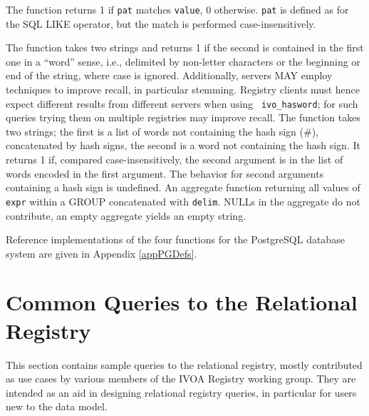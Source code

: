 \documentclass[11pt,a4paper]{ivoa}
\newcommand{\rtent}[1]{\texttt{\color{rtcolor} #1}}
\begin{document}
\begin{bigdescription}
The function returns 1 if \texttt{pat}  matches
\texttt{value}, 0 otherwise.
\texttt{pat}  is defined as for the SQL LIKE operator, but the
match is performed case-insensitively.

The function takes two strings and returns 1 if the second is
contained in the first one in a ``word'' sense, i.e., delimited by
non-letter characters or the beginning or end of the string, where case
is ignored.
Additionally, servers MAY employ techniques to improve recall, in
particular stemming.  Registry clients must hence expect different results
from different servers when using \rtent{ivo\_hasword}; for such
queries trying them on multiple registries may improve recall.
The function takes two strings; the first is a list of words not
containing the hash sign (\#), concatenated by hash signs, the second is
a word not containing the hash sign.  It returns 1 if, compared
case-insensitively, the second argument is in the list of words encoded in
the first argument.  The behavior for second
arguments containing a hash sign is undefined.
An aggregate function returning all values of
\texttt{expr} within a GROUP concatenated with 
\texttt{delim}.  NULLs in the aggregate do not contribute, an empty 
aggregate yields an empty string.

\end{bigdescription}

Reference implementations of the four functions for the PostgreSQL
database system are given in Appendix \ref{appPGDefs}.



\section{Common Queries to the Relational Registry}

\label{sample_queries}

This section contains sample queries to the relational registry,
mostly contributed as use cases by various members of the IVOA Registry
working group.  They are intended as an aid in designing relational
registry queries, in particular for users new to the data model.
\end{document}
